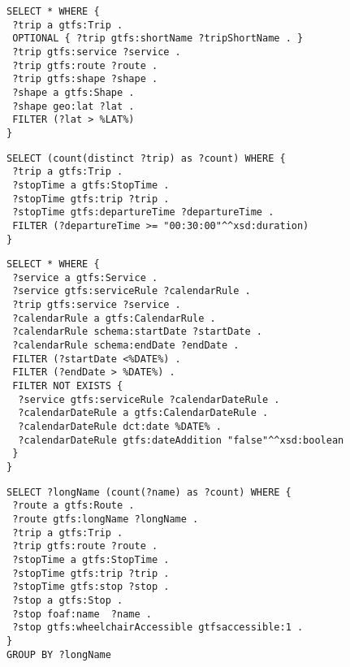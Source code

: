 \begin{lstlisting}[caption=Query 9 - Trips and associated shapes where lat is bigger than its average and some of their additional data, label=lst:sparql9, basicstyle=\small,frame=single]
SELECT * WHERE {
 ?trip a gtfs:Trip .
 OPTIONAL { ?trip gtfs:shortName ?tripShortName . }
 ?trip gtfs:service ?service .
 ?trip gtfs:route ?route .
 ?trip gtfs:shape ?shape .
 ?shape a gtfs:Shape .
 ?shape geo:lat ?lat .
 FILTER (?lat > %LAT%)
}
\end{lstlisting}

\begin{lstlisting}[caption=Query 10 - Number of trips that have a duration over 30 minutes, label=lst:sparql10,basicstyle=\small,frame=single]
SELECT (count(distinct ?trip) as ?count) WHERE {
 ?trip a gtfs:Trip .
 ?stopTime a gtfs:StopTime . 
 ?stopTime gtfs:trip ?trip . 
 ?stopTime gtfs:departureTime ?departureTime .
 FILTER (?departureTime >= "00:30:00"^^xsd:duration) 
}
\end{lstlisting}

\begin{lstlisting}[caption=Query 11 - Trips that are available on a certain date and some of their additional data, label=lst:sparql11, basicstyle=\small,frame=single]
SELECT * WHERE {
 ?service a gtfs:Service .
 ?service gtfs:serviceRule ?calendarRule .
 ?trip gtfs:service ?service .
 ?calendarRule a gtfs:CalendarRule .
 ?calendarRule schema:startDate ?startDate .
 ?calendarRule schema:endDate ?endDate .
 FILTER (?startDate <%DATE%) .
 FILTER (?endDate > %DATE%) .
 FILTER NOT EXISTS {
  ?service gtfs:serviceRule ?calendarDateRule . 
  ?calendarDateRule a gtfs:CalendarDateRule .
  ?calendarDateRule dct:date %DATE% .
  ?calendarDateRule gtfs:dateAddition "false"^^xsd:boolean 
 }
}
\end{lstlisting}

\begin{lstlisting}[caption=Query 12 - Number of stops that are wheelchair-accessible grouped by route and some of their additional data, label=lst:sparql12,basicstyle=\small,frame=single]
SELECT ?longName (count(?name) as ?count) WHERE { 	
 ?route a gtfs:Route .
 ?route gtfs:longName ?longName .
 ?trip a gtfs:Trip .
 ?trip gtfs:route ?route .
 ?stopTime a gtfs:StopTime .
 ?stopTime gtfs:trip ?trip .
 ?stopTime gtfs:stop ?stop .
 ?stop a gtfs:Stop .
 ?stop foaf:name  ?name .
 ?stop gtfs:wheelchairAccessible gtfsaccessible:1 .	
}
GROUP BY ?longName
\end{lstlisting}

